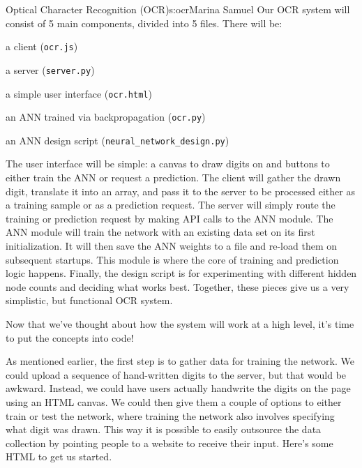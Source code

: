 \begin{aosachapter}{Optical Character Recognition (OCR)}{s:ocr}{Marina Samuel}
Our OCR system will consist of 5 main components, divided into 5 files.
There will be:

\begin{aosaitemize}

\item
  a client (\texttt{ocr.js})
\item
  a server (\texttt{server.py})
\item
  a simple user interface (\texttt{ocr.html})
\item
  an ANN trained via backpropagation (\texttt{ocr.py})
\item
  an ANN design script (\texttt{neural\_network\_design.py})
\end{aosaitemize}

The user interface will be simple: a canvas to draw digits on and
buttons to either train the ANN or request a prediction. The client will
gather the drawn digit, translate it into an array, and pass it to the
server to be processed either as a training sample or as a prediction
request. The server will simply route the training or prediction request
by making API calls to the ANN module. The ANN module will train the
network with an existing data set on its first initialization. It will
then save the ANN weights to a file and re-load them on subsequent
startups. This module is where the core of training and prediction logic
happens. Finally, the design script is for experimenting with different
hidden node counts and deciding what works best. Together, these pieces
give us a very simplistic, but functional OCR system.

Now that we've thought about how the system will work at a high level,
it's time to put the concepts into code!

\label{a-simple-interface-ocr.html}

As mentioned earlier, the first step is to gather data for training the
network. We could upload a sequence of hand-written digits to the
server, but that would be awkward. Instead, we could have users actually
handwrite the digits on the page using an HTML canvas. We could then
give them a couple of options to either train or test the network, where
training the network also involves specifying what digit was drawn. This
way it is possible to easily outsource the data collection by pointing
people to a website to receive their input. Here's some HTML to get us
started.


\end{aosachapter}
